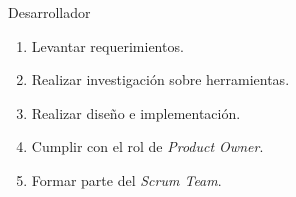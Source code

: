 	\begin{frame}{Desarrollador}
		\begin{enumerate}
			\item Levantar requerimientos.
			\item Realizar investigación sobre herramientas.
			\item Realizar diseño e implementación.
			\item Cumplir con el rol de \textit{Product Owner}.
			\item Formar parte del \textit{Scrum Team}.
		\end{enumerate}
	\end{frame}
